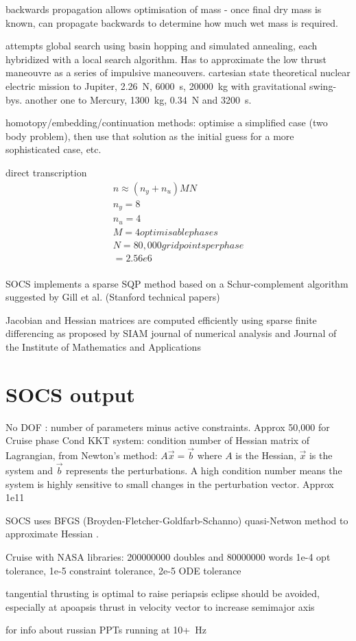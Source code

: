 backwards propagation allows optimisation of mass - once final dry mass is known, can propagate backwards to determine how much wet mass is required.


\cite{Yam2011} attempts global search using basin hopping and simulated annealing, each hybridized with a local search algorithm. Has to approximate the low thrust maneouvre as a series of impulsive maneouvers.
cartesian state
theoretical nuclear electric mission to Jupiter, 2.26~N, 6000~s, 20000~kg with gravitational swing-bys.
another one to Mercury, 1300~kg, 0.34~N and 3200~s.


homotopy/embedding/continuation methods: optimise a simplified case (two body problem), then use that solution as the initial guess for a more sophisticated case, etc.


direct transcription
\begin{subequations}
\begin{gather}
n \approx (n_y + n_u)MN \\
n_y = 8 \\
n_u = 4 \\
M = 4 optimisable phases \\
N = 80,000 grid points per phase \\
=2.56e6 \\
\end{gather}
\end{subequations}
\cite{Betts1998}

SOCS implements a sparse SQP method based on a Schur-complement algorithm suggested by Gill et al. (Stanford technical papers)

Jacobian and Hessian matrices are computed efficiently using sparse finite differencing as proposed by \cite{Coleman1983} SIAM journal of numerical analysis and \cite{Curtis1974} Journal of the Institute of Mathematics and Applications

\section{SOCS output}
No DOF : number of parameters minus active constraints. Approx 50,000 for Cruise phase
Cond KKT system: condition number of Hessian matrix of Lagrangian, from Newton's method: $A\vec{x}=\vec{b}$ where $A$ is the Hessian, $\vec{x}$ is the system and $\vec{b}$ represents the perturbations. A high condition number means the system is highly sensitive to small changes in the perturbation vector. Approx 1e11

SOCS uses BFGS (Broyden-Fletcher-Goldfarb-Schanno) quasi-Netwon method to approximate Hessian .

Cruise with NASA libraries: 200000000 doubles and 80000000 words
1e-4 opt tolerance, 1e-5 constraint tolerance, 2e-5 ODE tolerance



tangential thrusting is optimal to raise periapsis
eclipse should be avoided, especially at apoapsis
thrust in velocity vector to increase semimajor axis 
\textcite{Racca9}


\cite{Cabrera2011} for info about russian PPTs running at 10+~Hz